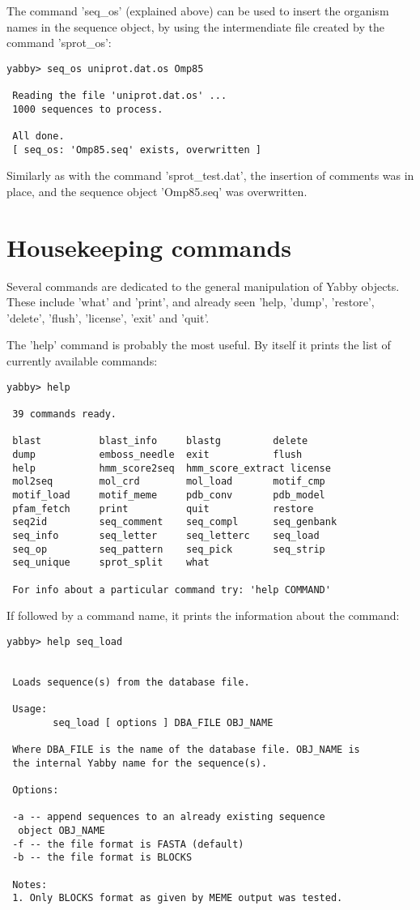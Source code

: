 The command 'seq\_os' (explained above) can be used to insert
the organism names in the sequence object, by using the
intermendiate file created by the command 'sprot\_os':

\begin{verbatim}
yabby> seq_os uniprot.dat.os Omp85

 Reading the file 'uniprot.dat.os' ...
 1000 sequences to process.

 All done.
 [ seq_os: 'Omp85.seq' exists, overwritten ]
\end{verbatim}

Similarly as with the command 'sprot\_test.dat', the insertion
of comments was in place, and the sequence object 'Omp85.seq'
was overwritten.  

\section{Housekeeping commands}


Several commands are dedicated to the general manipulation of
Yabby objects. These include 'what' and 'print', and already
seen 'help, 'dump', 'restore', 'delete', 'flush', 'license',
'exit' and 'quit'.

The 'help' command is probably the most useful. By itself it
prints the list of currently available commands: 

\begin{verbatim}
yabby> help

 39 commands ready.

 blast          blast_info     blastg         delete
 dump           emboss_needle  exit           flush
 help           hmm_score2seq  hmm_score_extract license
 mol2seq        mol_crd        mol_load       motif_cmp
 motif_load     motif_meme     pdb_conv       pdb_model
 pfam_fetch     print          quit           restore
 seq2id         seq_comment    seq_compl      seq_genbank
 seq_info       seq_letter     seq_letterc    seq_load
 seq_op         seq_pattern    seq_pick       seq_strip
 seq_unique     sprot_split    what

 For info about a particular command try: 'help COMMAND'
\end{verbatim}

If followed by a command name, it prints the information
about the command:

\begin{verbatim}
yabby> help seq_load


 Loads sequence(s) from the database file.

 Usage:
        seq_load [ options ] DBA_FILE OBJ_NAME

 Where DBA_FILE is the name of the database file. OBJ_NAME is
 the internal Yabby name for the sequence(s).

 Options:

 -a -- append sequences to an already existing sequence
  object OBJ_NAME
 -f -- the file format is FASTA (default)
 -b -- the file format is BLOCKS

 Notes:
 1. Only BLOCKS format as given by MEME output was tested.
\end{verbatim}

